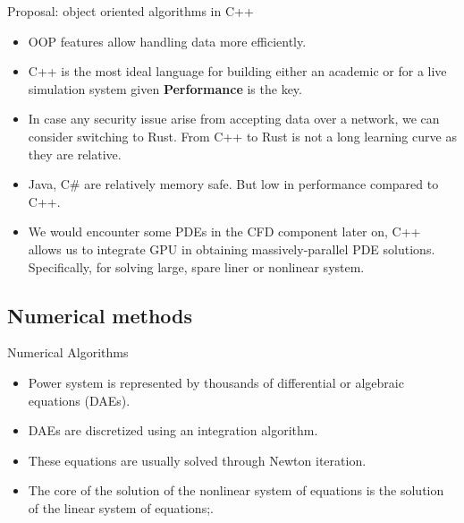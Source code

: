 \documentclass[xcolor=dvipsnames]{beamer}
\begin{document}





\begin{frame}{Proposal: object oriented algorithms in C++}
\begin{itemize}
	\item OOP features allow handling data more efficiently. 
	\item C++ is the most ideal language for building either an academic or for a live simulation system given \textbf{Performance} is the key. 
	\item  In case any security issue arise from accepting data over a network, we can consider switching to Rust. From C++ to Rust is not a long learning curve as they are relative.
	\item Java, C\# are relatively memory safe. But low in performance compared to C++.
	\item We would encounter some PDEs in the CFD component later on, C++ allows us to integrate GPU in obtaining massively-parallel PDE solutions. Specifically, for solving large, spare liner or nonlinear system.
\end{itemize}
\end{frame}

\subsection{Numerical methods}
\begin{frame}{Numerical Algorithms}
	\begin{itemize}
		\item Power system is represented by thousands of differential or algebraic equations (DAEs).
		\item DAEs are discretized using an integration algorithm.
		\item These equations are usually solved through Newton iteration.
		\item The core of the solution of the nonlinear system of equations is the solution of the linear system of equations;. 
	\end{itemize}
\end{frame}
\end{document}
